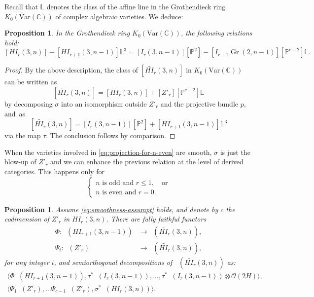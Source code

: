 \documentclass[11pt]{article}
\newcommand{\Var}{\mathrm{Var}}
\let\mathcal\mathscr
\theoremstyle{plain}
\newtheorem{prop}[theorem]{Proposition}
\theoremstyle{definition}
\newcommand{\cat}[1]{\mathsf{#1}}
\newcommand{\sod}[1]{\langle #1 \rangle}
\DeclareMathOperator{\Db}{{\cat{D}^{\mathrm{b}}}}
\DeclareMathOperator{\Gr}{Gr}
\newcommand{\CC}{\mathbb{C}}
\newcommand{\LL}{\mathbb{L}}
\newcommand{\PP}{\mathbb{P}}
\newcommand{\sheaf}[1]{\mathcal{#1}}
\newcommand{\ko}{\sheaf{O}}\let\OO\ko\let\cO\ko
\begin{document}
Recall that $\LL$ denotes the class of the affine line in the Grothendieck ring $K_0(\Var(\CC))$ of complex algebraic varieties. We deduce:

\begin{prop}\label{prop:K0-projection}
In the Grothendieck ring $K_0(\Var(\CC))$, the following relations hold:%
\begin{equation*}\label{eq:rel-in-K0-proj}
[HI_r(3,n)] - [HI_{r+1}(3,n-1)]\LL^3 = [I_r(3,n-1)][\PP^2] - [I_{r+1} \Gr(2,n-1)][\PP^{c-2}]\LL.
\end{equation*}
\end{prop}

\begin{proof}
By the above description, the class of $[\widetilde{HI_r}(3,n)]$ in $K_0(\Var(\CC))$ can be written as
\[
[\widetilde{HI_r}(3,n)]=[HI_r(3,n)]+ [Z'_r][\PP^{c-2}]\LL
\]
by decomposing $\sigma$ into an isomorphism outside $Z'_r$ and the projective bundle $p$, and~as
\[
[\widetilde{HI_r}(3,n)]=[I_r(3,n-1)][\PP^2] + [HI_{r+1}(3,n-1)]\LL^3
\]
via the map $\tau$. The conclusion follows by comparison.
\end{proof}

When the varieties involved in \eqref{eq:projection-for-n-even} are smooth, $\sigma$
is just the blow-up of $Z'_r$ and we can enhance the previous relation at the level of
derived categories. This happens only for
\begin{equation}\label{eq:smoothness-assumpt}
\begin{cases}
n \text{ is odd and } r \leq 1,& \text{or}\\
n \text{ is even and } r=0.
\end{cases}
\end{equation}
\begin{prop}\label{prop:deco-projection}
Assume \eqref{eq:smoothness-assumpt} holds, and denote by $c$ the codimension of $Z'_r$ in $HI_r(3,n)$.
There are fully faithful functors
\begin{align*}
\Phi: \Db(HI_{r+1}(3,n-1)) &\to \Db(\widetilde{HI_r}(3,n)),\\
\Psi_i:\Db(Z'_r) &\to \Db(\widetilde{HI_r}(3,n)),
\end{align*}
for any integer $i$, and semiorthogonal decompositions of $\Db(\widetilde{HI_r}(3,n))$ as:
\begin{gather}\label{eq:our-deco-proj}
\sod{\Phi \Db(HI_{r+1}(3,n-1)),\tau^* \Db(I_r(3,n-1)), \ldots, \tau^* \Db(I_r(3,n-1)) \otimes \ko(2H)},
\\
\label{eq:Orlov-deco-proj}
\sod{\Psi_1 \Db(Z'_r),\ldots \Psi_{c-1} \Db(Z'_r), \sigma^* \Db(HI_r(3,n))}.
\end{gather}
\end{prop}
\end{document}
